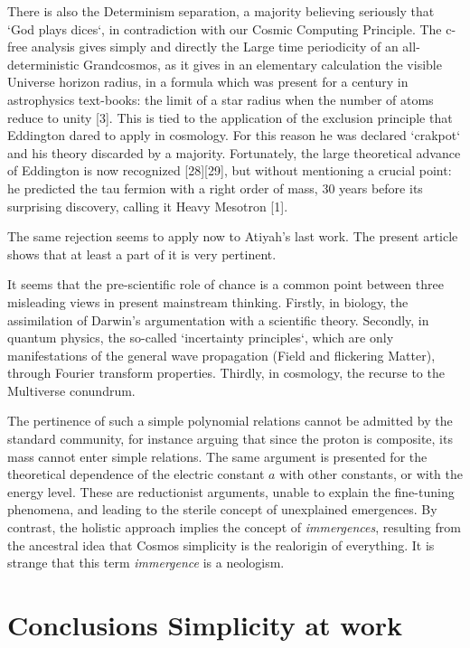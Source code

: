 \documentclass[twoside,draft]{article}
\begin{document}
\begin{sloppypar}
{There is also the Determinism separation, a majority believing seriously that `God plays dices`,
in contradiction with our Cosmic Computing Principle. The c-free analysis gives simply and
directly the Large time periodicity of an all-deterministic Grandcosmos, as it gives in an elementary
calculation the visible Universe horizon radius, in a formula which was present for a century in
astrophysics text-books: the limit of a star radius when the number of atoms reduce to unity [3].
This is tied to the application of the exclusion principle that Eddington dared to apply in
cosmology. For this reason he was declared `crakpot` and his theory discarded by a majority.
Fortunately, the large theoretical advance of Eddington is now recognized [28][29], but without
mentioning a crucial point: he predicted the tau fermion with a right order of mass, 30 years before its surprising discovery, calling it Heavy Mesotron [1].

The same rejection seems to apply now to Atiyah's last work. The present article shows that at
least a part of it is very pertinent.

It seems that the pre-scientific role of chance is a common point between three misleading views
in present mainstream thinking. Firstly, in biology, the assimilation of Darwin's argumentation
with a scientific theory. Secondly, in quantum physics, the so-called `incertainty principles`, which are
only manifestations of the general wave propagation (Field and flickering Matter), through Fourier
transform properties. Thirdly, in cosmology, the recurse to the Multiverse conundrum.

The pertinence of such a simple polynomial relations cannot be admitted by the standard community, for instance arguing that since the proton is composite, its mass cannot enter simple relations. The same argument is presented for the theoretical dependence of the electric constant $a$ with other constants, or with the energy level. These are reductionist arguments, unable to explain the fine-tuning phenomena, and leading to the sterile concept of unexplained emergences. By contrast, the holistic approach implies the concept of \textit{immergences}, resulting from the ancestral idea that Cosmos simplicity is the realorigin of everything. It is strange that this term \textit{immergence} is a neologism. 


\section {Conclusions Simplicity at work}

}
\end{sloppypar}
\end{document}
